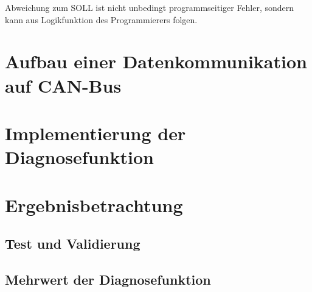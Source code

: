 Abweichung zum SOLL ist nicht unbedingt programmseitiger Fehler, sondern kann aus Logikfunktion des Programmierers folgen. 

\section{Aufbau einer Datenkommunikation auf CAN-Bus} \label{sec:AufbauDatenkommunikation} %

\section{Implementierung der Diagnosefunktion} \label{sec:ImplementierungDiagnose} %

\section{Ergebnisbetrachtung} \label{sec:ErgebnisDiagnose} %
\subsection{Test und Validierung} \label{subsec:TestValidierungDiagnose}
\subsection{Mehrwert der Diagnosefunktion} \label{subsec:MehrwertDiagnose}



